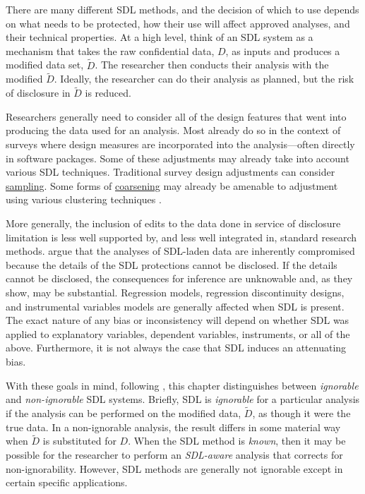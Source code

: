 There are many different SDL methods, and the decision of which to use depends on what needs to be protected, how their use will affect approved analyses, and their technical properties. At a high level, think of an SDL system as a mechanism that takes the raw confidential data, \(D\), as inputs and produces a modified data set, \(\tilde{D}\). The researcher then conducts their analysis with the modified \(\tilde{D}\). Ideally, the researcher can do their analysis as planned, but the risk of disclosure in \(\tilde{D}\) is reduced.

Researchers generally need to consider all of the design features that went into producing the data used for an analysis. Most already do so in the context of surveys where design measures are incorporated into the analysis---often directly in software packages. Some of these adjustments may already take into account various SDL techniques. Traditional survey design adjustments can consider \protect\hyperlink{sampling}{sampling}. Some forms of \protect\hyperlink{coarsening}{coarsening} may already be amenable to adjustment using various clustering techniques \citep{moulton_random_1986,cameron_practitioners_2015}.

More generally, the inclusion of edits to the data done in service of disclosure limitation is less well supported by, and less well integrated in, standard research methods. \citet{abowd_economic_2015} argue that the analyses of SDL-laden data are inherently compromised because the details of the SDL protections cannot be disclosed. If the details cannot be disclosed, the consequences for inference are unknowable and, as they show, may be substantial. Regression models, regression discontinuity designs, and instrumental variables models are generally affected when SDL is present. The exact nature of any bias or inconsistency will depend on whether SDL was applied to explanatory variables, dependent variables, instruments, or all of the above. Furthermore, it is not always the case that SDL induces an attenuating bias.

With these goals in mind, following \citet{abowd_economic_2015}, this chapter distinguishes between \emph{ignorable} and \emph{non-ignorable} SDL systems. Briefly, SDL is \emph{ignorable} for a particular analysis if the analysis can be performed on the modified data, \(\tilde{D}\), as though it were the true data. In a non-ignorable analysis, the result differs in some material way when \(\tilde{D}\) is substituted for \(D\). When the SDL method is \emph{known}, then it may be possible for the researcher to perform an \emph{SDL-aware} analysis that corrects for non-ignorability. However, SDL methods are generally not ignorable except in certain specific applications.

